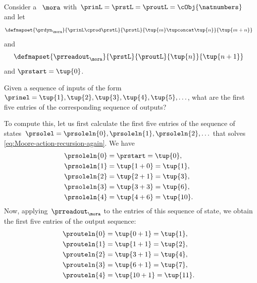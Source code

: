 {\begin{example}
    \label{exa:moore-standard-action}
    Consider a ~$\mora$ with~$\prinL = \prstL = \proutL = \cObj{\natnumbers}$ and let
    \begin{equation}\label{eq:exa-moore-machine-integers-1}
        \defmapset{
            \prdyn_\mora
        }{
            \prinL \cprod \prstL
        }{
            \prstL
        }{
            \tup{m} \tupconcat \tup{n}
        }{
            \tup{m + n}
        }
    \end{equation}
    and
    \begin{equation}\label{eq:exa-moore-machine-integers-2}
        \defmapset{
            \prreadout_\mora
        }{
            \prstL
        }{
            \proutL
        }{
            \tup{n}
        }{
            \tup{n+1}
        }
    \end{equation}
    and $\prstart = \tup{0}$.

    Given a sequence of inputs of the form~$\prinel = \tup{1}, \tup{2}, \tup{3}, \tup{4}, \tup{5}, \ldots$, what are the first five entries of the corresponding sequence of outputs?

    To compute this, let us first calculate the first five entries of the sequence of states~$\prsolel = \prsoleln{0}, \prsoleln{1}, \prsoleln{2}, \ldots$ that solves \cref{eq:Moore-action-recursion-again}.
    We have
    \begin{align}\label{eq:moore-action-exa-calc-1}
        \prsoleln{0} & = \prstart = \tup{0}, \\
        \prsoleln{1} & = \tup{1 + 0} = \tup{1}, \\
        \prsoleln{2} & = \tup{2 + 1} = \tup{3}, \\
        \prsoleln{3} & = \tup{3 + 3} = \tup{6}, \\
        \prsoleln{4} & = \tup{4 + 6} = \tup{10}.
    \end{align}
    Now, applying~$\prreadout_\mora$ to the entries of this sequence of state, we obtain the first five entries of the output sequence:
    \begin{align}\label{eq:moore-action-exa-calc-2}
        \prouteln{0} & = \tup{0 + 1} = \tup{1}, \\
        \prouteln{1} & = \tup{1 + 1} = \tup{2}, \\
        \prouteln{2} & = \tup{3 + 1} = \tup{4}, \\
        \prouteln{3} & = \tup{6 + 1} = \tup{7}, \\
        \prouteln{4} & = \tup{10 + 1} = \tup{11}.
    \end{align}
\end{example}

}
